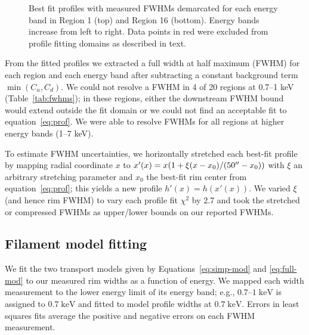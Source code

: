 \documentclass[iop, apj, numberedappendix]{emulateapj}
\newcommand*{\mt}{\mathrm}
\newcommand*{\unit}[1]{\;\mt{#1}}  %
\begin{document}
\begin{figure*}[ht]
    \caption{Best fit profiles with measured FWHMs demarcated for each energy
        band in Region 1 (top) and Region 16 (bottom).  Energy bands increase
        from left to right.  Data points in red were excluded from profile
        fitting domains as described in text.}
    \label{fig:profiles}
\end{figure*}

From the fitted profiles we extracted a full width at half maximum (FWHM) for
each region and each energy band after subtracting a constant background term
$\min(C_u, C_d)$.  We could not resolve a FWHM in 4 of 20 regions at 0.7--1 keV
(Table~\ref{tab:fwhms}); in these regions, either the downstream FWHM bound
would extend outside the fit domain or we could not find an acceptable fit to
equation~\eqref{eq:prof}.  We were able to resolve FWHMs for all regions at
higher energy bands (1--7 keV).

To estimate FWHM uncertainties, we horizontally stretched each best-fit
profile by mapping radial coordinate $x$ to
$x'(x) = x (1 + \xi (x-x_0)/(50\mbox{$^{\prime\prime}$}-x_0))$ with $\xi$ an arbitrary stretching
parameter and $x_0$ the best-fit rim center from equation~\eqref{eq:prof};
this yields a new profile $h'(x) = h(x'(x))$.
We varied $\xi$ (and hence rim FWHM) to vary each profile fit $\chi^2$ by 2.7
and took the stretched or compressed FWHMs as upper/lower bounds on our
reported FWHMs.

\subsection{Filament model fitting}
\label{sec:fits}

We fit the two transport models given by Equations~\eqref{eq:simp-mod} and
\eqref{eq:full-mod} to our measured rim widths as a function of energy.
We mapped each width measurement to the lower energy limit of its energy band;
e.g., $0.7$--$1 \unit{keV}$ is assigned to $0.7 \unit{keV}$ and fitted to
model profile widths at $0.7 \unit{keV}$.  Errors in least squares fits
average the positive and negative errors on each FWHM measurement.
\end{document}
